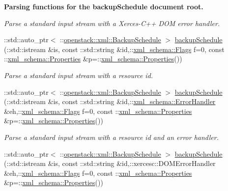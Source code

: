 \begin{Indent}{\bf Parsing functions for the backupSchedule document root.}
\begin{DoxyCompactItemize}
\begin{DoxyCompactList}\small\item\em Parse a standard input stream with a Xerces-\/C++ DOM error handler. \item\end{DoxyCompactList}\item 
::std::auto\_\-ptr$<$ ::\hyperlink{classopenstack_1_1xml_1_1BackupSchedule}{openstack::xml::BackupSchedule} $>$ \hyperlink{namespaceopenstack_1_1xml_a744f6ba45e9f006a58501a471a048abb}{backupSchedule} (::std::istream \&is, const ::std::string \&id,::\hyperlink{namespacexml__schema_affb4c227cbd9aa7453dd1dc5a1401943}{xml\_\-schema::Flags} f=0, const ::\hyperlink{namespacexml__schema_ad27ce19a7ee1d3b1064092648898f64c}{xml\_\-schema::Properties} \&p=::\hyperlink{namespacexml__schema_ad27ce19a7ee1d3b1064092648898f64c}{xml\_\-schema::Properties}())
\begin{DoxyCompactList}\small\item\em Parse a standard input stream with a resource id. \item\end{DoxyCompactList}\item 
::std::auto\_\-ptr$<$ ::\hyperlink{classopenstack_1_1xml_1_1BackupSchedule}{openstack::xml::BackupSchedule} $>$ \hyperlink{namespaceopenstack_1_1xml_a4fa919c147952a81bc6d9159ae5b91ef}{backupSchedule} (::std::istream \&is, const ::std::string \&id,::\hyperlink{namespacexml__schema_ab1c9361bfd3b404eaabf0c31eded79dc}{xml\_\-schema::ErrorHandler} \&eh,::\hyperlink{namespacexml__schema_affb4c227cbd9aa7453dd1dc5a1401943}{xml\_\-schema::Flags} f=0, const ::\hyperlink{namespacexml__schema_ad27ce19a7ee1d3b1064092648898f64c}{xml\_\-schema::Properties} \&p=::\hyperlink{namespacexml__schema_ad27ce19a7ee1d3b1064092648898f64c}{xml\_\-schema::Properties}())
\begin{DoxyCompactList}\small\item\em Parse a standard input stream with a resource id and an error handler. \item\end{DoxyCompactList}\item 
::std::auto\_\-ptr$<$ ::\hyperlink{classopenstack_1_1xml_1_1BackupSchedule}{openstack::xml::BackupSchedule} $>$ \hyperlink{namespaceopenstack_1_1xml_aba23f4c9c80b8ae2aedd2c9c7e5e96b6}{backupSchedule} (::std::istream \&is, const ::std::string \&id,::xercesc::DOMErrorHandler \&eh,::\hyperlink{namespacexml__schema_affb4c227cbd9aa7453dd1dc5a1401943}{xml\_\-schema::Flags} f=0, const ::\hyperlink{namespacexml__schema_ad27ce19a7ee1d3b1064092648898f64c}{xml\_\-schema::Properties} \&p=::\hyperlink{namespacexml__schema_ad27ce19a7ee1d3b1064092648898f64c}{xml\_\-schema::Properties}())

\end{DoxyCompactItemize}
\end{Indent}
